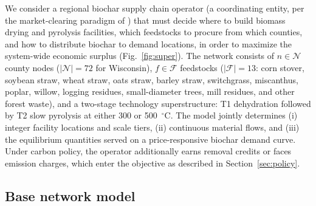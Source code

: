 We consider a regional biochar supply chain operator (a coordinating entity,
per the market-clearing paradigm of \cite{sampat2019,ma2023}) that must decide where to
build biomass drying and pyrolysis facilities, which feedstocks to procure from
which counties, and how to distribute biochar to demand locations, in order to
maximize the system-wide economic surplus (Fig.~\ref{fig:super}). The network
consists of $n \in
\mathcal{N}$ county nodes ($|\mathcal{N}|=72$ for Wisconsin), $f \in \mathcal{F}$
feedstocks ($|\mathcal{F}|=13$: corn stover, soybean straw, wheat straw, oats
straw, barley straw, switchgrass, miscanthus, poplar, willow, logging residues,
small-diameter trees, mill residues, and other forest waste), and a two-stage
technology superstructure: T1 dehydration followed by T2 slow pyrolysis at
either 300 or 500~$^\circ$C. The model jointly determines (i) integer facility
locations and scale tiers, (ii) continuous material flows, and (iii) the
equilibrium quantities served on a price-responsive biochar demand curve. Under
carbon policy, the operator additionally earns removal credits or faces
emission charges, which enter the objective as described in
Section~\ref{sec:policy}.

\subsection{Base network model}

